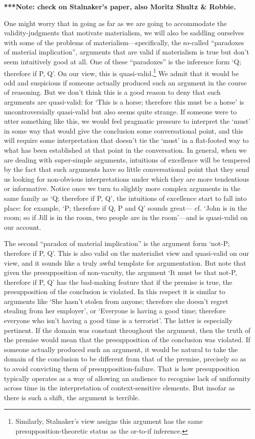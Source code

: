 \textbf{***Note: check on Stalnaker's paper, also Moritz Shultz \&
Robbie. }

One might worry that in going as far as we are going to accommodate the
validity-judgments that motivate materialism, we will also be saddling
ourselves with some of the problems of materialism---specifically, the
so-called ``paradoxes of material implication'', arguments that are
valid if materialism is true but don't seem intuitively good at all. One
of these ``paradoxes'' is the inference form `Q; therefore if P, Q'. On
our view, this is quasi-valid.\footnote{Similarly, Stalnaker's view
  assigns this argument has the same presupposition-theoretic status as
  the or-to-if inference.} We admit that it would be odd and suspicious
if someone actually produced such an argument in the course of
reasoning. But we don't think this is a good reason to deny that such
arguments are quasi-valid: for `This is a horse; therefore this must be
a horse' is uncontroversially quasi-valid but also seems quite strange.
If someone were to utter something like this, we would feel pragmatic
pressure to interpret the `must' in some way that would give the
conclusion some conversational point, and this will require some
interpretation that doesn't tie the `must' in a flat-footed way to what
has been established at that point in the conversation. In general, when
we are dealing with super-simple arguments, intuitions of excellence
will be tempered by the fact that such arguments have so little
conversational point that they send us looking for non-obvious
interpretations under which they are more tendentious or informative.
Notice once we turn to slightly more complex arguments in the same
family as `Q; therefore if P, Q', the intuitions of excellence start to
fall into place: for example, `P; therefore if Q, P and Q' sounds
great--- cf. `John is in the room; so if Jill is in the room, two people
are in the room'---and is quasi-valid on our account.

The second ``paradox of material implication'' is the argument form
`not-P; therefore if P, Q'. This is also valid on the materialist view
and quasi-valid on our view, and it sounds like a truly awful template
for argumentation. But note that given the presupposition of
non-vacuity, the argument `It must be that not-P, therefore if P, Q' has
the bad-making feature that if the premise is true, the presupposition
of the conclusion is violated. In this respect it is similar to
arguments like `She hasn't stolen from anyone; therefore she doesn't
regret stealing from her employer', or `Everyone is having a good time;
therefore everyone who isn't having a good time is a terrorist'. The
latter is especially pertinent. If the domain was constant throughout
the argument, then the truth of the premise would mean that the
presupposition of the conclusion was violated. If someone actually
produced such an argument, it would be natural to take the domain of the
conclusion to be different from that of the premise, precisely so as to
avoid convicting them of presupposition-failure. That is how
presupposition typically operates as a way of allowing an audience to
recognise lack of uniformity across time in the interpretation of
context-sensitive elements. But insofar as there is such a shift, the
argument is terrible.

